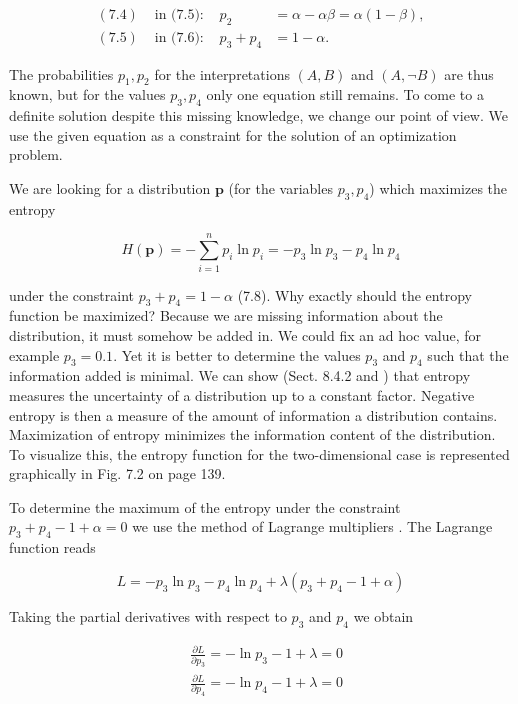 \documentclass[10pt]{book}
\begin{document}
\begin{align*}
(7.4) & \text { in (7.5): } & p_{2} & =\alpha-\alpha \beta=\alpha(1-\beta),  \tag{7.7}\\
(7.5) & \text { in (7.6): } & p_{3}+p_{4} & =1-\alpha . \tag{7.8}
\end{align*}

The probabilities $p_{1}, p_{2}$ for the interpretations $(A, B)$ and $(A, \neg B)$ are thus known, but for the values $p_{3}, p_{4}$ only one equation still remains. To come to a definite solution despite this missing knowledge, we change our point of view. We use the given equation as a constraint for the solution of an optimization problem.

We are looking for a distribution $\boldsymbol{p}$ (for the variables $p_{3}, p_{4}$) which maximizes the entropy

\begin{equation*}
H(\boldsymbol{p})=-\sum_{i=1}^{n} p_{i} \ln p_{i}=-p_{3} \ln p_{3}-p_{4} \ln p_{4} \tag{7.9}
\end{equation*}

under the constraint $p_{3}+p_{4}=1-\alpha$ (7.8). Why exactly should the entropy function be maximized? Because we are missing information about the distribution, it must somehow be added in. We could fix an ad hoc value, for example $p_{3}=0.1$. Yet it is better to determine the values $p_{3}$ and $p_{4}$ such that the information added is minimal. We can show (Sect. 8.4.2 and \cite{sw76}) that entropy measures the uncertainty of a distribution up to a constant factor. Negative entropy is then a measure of the amount of information a distribution contains. Maximization of entropy minimizes the information content of the distribution. To visualize this, the entropy function for the two-dimensional case is represented graphically in Fig. 7.2 on page 139.

To determine the maximum of the entropy under the constraint $p_{3}+p_{4}-1+\alpha=0$ we use the method of Lagrange multipliers \cite{ste07}. The Lagrange function reads

$$
L=-p_{3} \ln p_{3}-p_{4} \ln p_{4}+\lambda\left(p_{3}+p_{4}-1+\alpha\right)
$$

Taking the partial derivatives with respect to $p_{3}$ and $p_{4}$ we obtain

$$
\begin{aligned}
& \frac{\partial L}{\partial p_{3}}=-\ln p_{3}-1+\lambda=0 \\
& \frac{\partial L}{\partial p_{4}}=-\ln p_{4}-1+\lambda=0
\end{aligned}
$$
\end{document}
